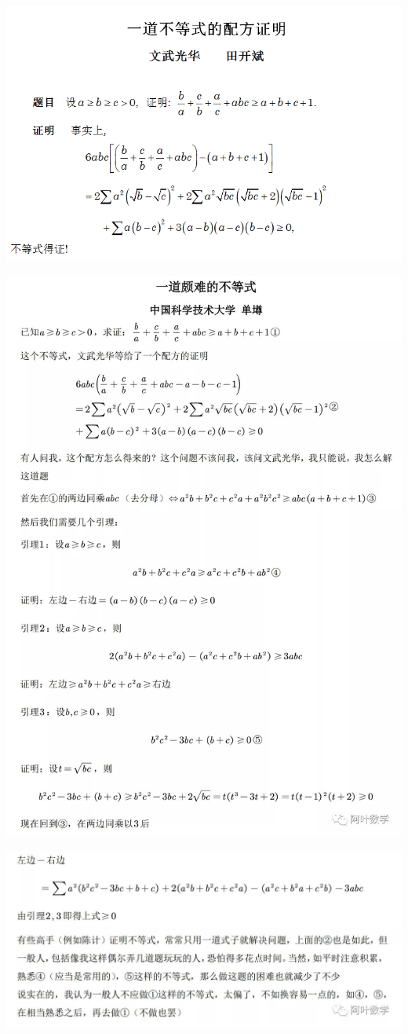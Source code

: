 \documentclass[UTF8]{ctexart}
\begin{document}
\subsection{}
\begin{center}
	\includegraphics[width=0.8\linewidth]{a17}
\end{center}
\begin{center}
	\includegraphics[width=0.5\linewidth]{a18}
\end{center}
\begin{center}
	\includegraphics[width=0.5\linewidth]{a19}
\end{center}
\end{document}
